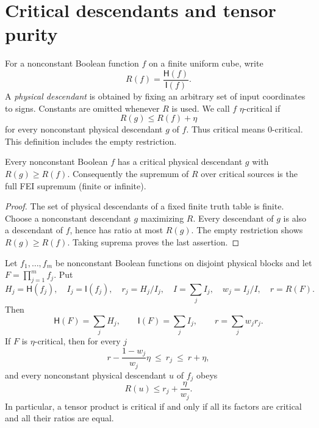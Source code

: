 \section*{Critical descendants and tensor purity}

For a nonconstant Boolean function $f$ on a finite uniform cube, write
\[
 R(f)=\frac{\mathsf H(f)}{\mathsf I(f)}.
\]
A \emph{physical descendant} is obtained by fixing an arbitrary set of input
coordinates to signs.  Constants are omitted whenever $R$ is used.  We call
$f$ $\eta$-critical if
\[
 R(g)\le R(f)+\eta                                      \tag{1}
\]
for every nonconstant physical descendant $g$ of $f$.  Thus critical means
$0$-critical.  This definition includes the empty restriction.

\begin{proposition}\label{prop:reduction}
Every nonconstant Boolean $f$ has a critical physical descendant $g$ with
$R(g)\ge R(f)$.  Consequently the supremum of $R$ over critical sources is
the full FEI supremum (finite or infinite).
\end{proposition}

\begin{proof}
The set of physical descendants of a fixed finite truth table is finite.
Choose a nonconstant descendant $g$ maximizing $R$.  Every descendant of $g$
is also a descendant of $f$, hence has ratio at most $R(g)$.  The empty
restriction shows $R(g)\ge R(f)$.  Taking suprema proves the last assertion.
\end{proof}

\begin{theorem}\label{thm:purity}
Let $f_1,\ldots,f_m$ be nonconstant Boolean functions on disjoint physical
blocks and let $F=\prod_{j=1}^m f_j$.  Put
\[
 H_j=\mathsf H(f_j),\quad I_j=\mathsf I(f_j),\quad
 r_j=H_j/I_j,\quad I=\sum_j I_j,\quad w_j=I_j/I,
 \quad r=R(F).
\]
Then
\[
 \mathsf H(F)=\sum_jH_j,\qquad \mathsf I(F)=\sum_jI_j,
 \qquad r=\sum_jw_jr_j.                              \tag{2}
\]
If $F$ is $\eta$-critical, then for every $j$
\[
 r-\frac{1-w_j}{w_j}\eta\ \le\ r_j\ \le\ r+\eta, \tag{3}
\]
and every nonconstant physical descendant $u$ of $f_j$ obeys
\[
 R(u)\le r_j+\frac{\eta}{w_j}.                       \tag{4}
\]
In particular, a tensor product is critical if and only if all its factors
are critical and all their ratios are equal.
\end{theorem}

